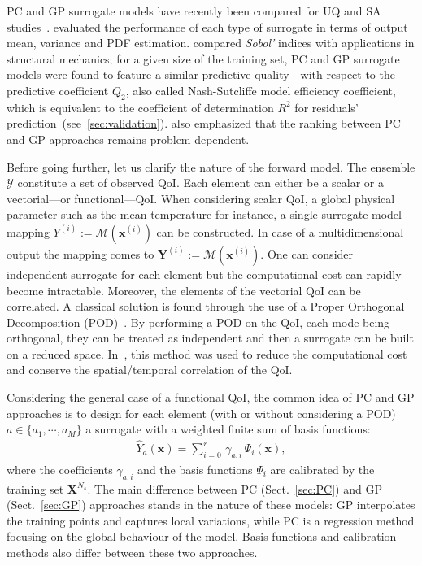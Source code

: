 PC and GP surrogate models have recently been compared for UQ and SA studies~\citep{legratiet2017,owen2015,schoebi2015}. \citet{owen2015} evaluated the performance of each type of surrogate in terms of output mean, variance and PDF estimation. \citet{legratiet2017} compared \emph{Sobol'} indices with applications in structural mechanics; for a given size of the training set, PC and GP surrogate models were found to feature a similar predictive quality---with respect to the predictive coefficient $Q_2$, also called Nash-Sutcliffe model efficiency coefficient, which is equivalent to the coefficient of determination $R^2$ for residuals' prediction~\citep{krause2005}(see~\cref{sec:validation}). \citet{legratiet2017} also emphasized that the ranking between PC and GP approaches remains problem-dependent.

Before going further, let us clarify the nature of the forward model. The ensemble $\mathcal{Y}$ constitute a set of observed QoI. Each element can either be a scalar or a vectorial---or functional---QoI. When considering scalar QoI, a global physical parameter such as the mean temperature for instance, a single surrogate model mapping $Y^{(i)} := \mathcal{M}(\mathbf{x}^{(i)})$ can be constructed. In case of a multidimensional output the mapping comes to $\mathbf{Y}^{(i)} := \mathcal{M}(\mathbf{x}^{(i)})$. One can consider independent surrogate for each element but the computational cost can rapidly become intractable. Moreover, the elements of the vectorial QoI can be correlated. A classical solution is found through the use of a Proper Orthogonal Decomposition (POD)~\cite{anindyachatterjee2000}. By performing a POD on the QoI, each mode being orthogonal, they can be treated as independent and then a surrogate can be built on a reduced space. In~\cite{braconnier2011,margheri2016}, this method was used to reduce the computational cost and conserve the spatial/temporal correlation of the QoI.

Considering the general case of a functional QoI, the common idea of PC and GP approaches is to design for each element (with or without considering a POD) $a \in \{a_1, \cdots, a_M\}$ a surrogate with a weighted finite sum of basis functions:
\begin{align}
\widehat{Y}_a\left(\mathbf{x}\right) = \displaystyle\sum_{i = 0}^{r}\,\gamma_{a,i}\,\Psi_{i}\left(\mathbf{x}\right),
\label{eq:SurrogateForm}
\end{align}
where the coefficients $\gamma_{a,i}$ and the basis functions $\Psi_i$ are calibrated by the training set $\mathbf{X}^{N_s}$. The main difference between PC (Sect.~\ref{sec:PC}) and GP (Sect.~\ref{sec:GP}) approaches stands in the nature of these models: GP interpolates the training points and captures local variations, while PC is a regression method focusing on the global behaviour of the model. Basis functions and calibration methods also differ between these two approaches.

